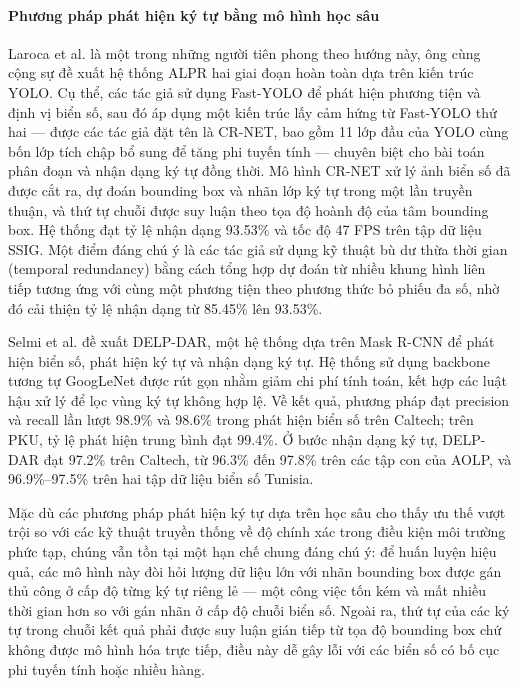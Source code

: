 \documentclass[../DoAn.tex]{subfiles}
\begin{document}
\paragraph{Phương pháp phát hiện ký tự bằng mô hình học sâu}
Laroca et al. \cite{laroca2018robust} là một trong những người tiên phong theo hướng này, ông cùng cộng sự đề xuất hệ thống ALPR hai giai đoạn hoàn toàn dựa trên kiến trúc YOLO. Cụ thể, các tác giả sử dụng Fast-YOLO để phát hiện phương tiện và định vị biển số, sau đó áp dụng một kiến trúc lấy cảm hứng từ Fast-YOLO thứ hai — được các tác giả đặt tên là CR-NET, bao gồm 11 lớp đầu của YOLO cùng bốn lớp tích chập bổ sung để tăng phi tuyến tính — chuyên biệt cho bài toán phân đoạn và nhận dạng ký tự đồng thời. Mô hình CR-NET xử lý ảnh biển số đã được cắt ra, dự đoán bounding box và nhãn lớp ký tự trong một lần truyền thuận, và thứ tự chuỗi được suy luận theo tọa độ hoành độ của tâm bounding box. Hệ thống đạt tỷ lệ nhận dạng 93.53\% và tốc độ 47 FPS trên tập dữ liệu SSIG. Một điểm đáng chú ý là các tác giả sử dụng kỹ thuật bù dư thừa thời gian (temporal redundancy) bằng cách tổng hợp dự đoán từ nhiều khung hình liên tiếp tương ứng với cùng một phương tiện theo phương thức bỏ phiếu đa số, nhờ đó cải thiện tỷ lệ nhận dạng từ 85.45\% lên 93.53\%.

Selmi et al. \cite{selmi2020delpdar} đề xuất DELP-DAR, một hệ thống dựa trên Mask R-CNN để phát hiện biển số, phát hiện ký tự và nhận dạng ký tự. Hệ thống sử dụng backbone tương tự GoogLeNet được rút gọn nhằm giảm chi phí tính toán, kết hợp các luật hậu xử lý để lọc vùng ký tự không hợp lệ. Về kết quả, phương pháp đạt precision và recall lần lượt 98.9\% và 98.6\% trong phát hiện biển số trên Caltech; trên PKU, tỷ lệ phát hiện trung bình đạt 99.4\%. Ở bước nhận dạng ký tự, DELP-DAR đạt 97.2\% trên Caltech, từ 96.3\% đến 97.8\% trên các tập con của AOLP, và 96.9\%--97.5\% trên hai tập dữ liệu biển số Tunisia.


Mặc dù các phương pháp phát hiện ký tự dựa trên học sâu cho thấy ưu thế vượt trội so với các kỹ thuật truyền thống về độ chính xác trong điều kiện môi trường phức tạp, chúng vẫn tồn tại một hạn chế chung đáng chú ý: để huấn luyện hiệu quả, các mô hình này đòi hỏi lượng dữ liệu lớn với nhãn bounding box được gán thủ công ở cấp độ từng ký tự riêng lẻ — một công việc tốn kém và mất nhiều thời gian hơn so với gán nhãn ở cấp độ chuỗi biển số. Ngoài ra, thứ tự của các ký tự trong chuỗi kết quả phải được suy luận gián tiếp từ tọa độ bounding box chứ không được mô hình hóa trực tiếp, điều này dễ gây lỗi với các biển số có bố cục phi tuyến tính hoặc nhiều hàng.
\end{document}
